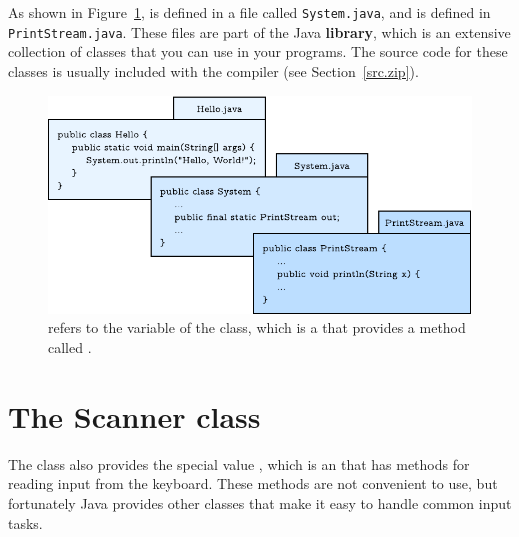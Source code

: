 
As shown in Figure~\ref{fig.system},  is defined in a file called {\tt System.java}, and  is defined in {\tt PrintStream.java}.
These files are part of the Java {\bf library}, which is an extensive collection of classes that you can use in your programs.
The source code for these classes is usually included with the compiler (see Section~\ref{src.zip}).

\begin{figure}[!ht]
\begin{center}
\includegraphics{figs/system.pdf}
\caption{ refers to the  variable of the  class, which is a  that provides a method called .}
\label{fig.system}
\end{center}
\end{figure}


\section{The Scanner class}
\label{scanner}


%


The  class also provides the special value , which is an  that has methods for reading input from the keyboard.
These methods are not convenient to use, but fortunately Java provides other classes that make it easy to handle common input tasks.

